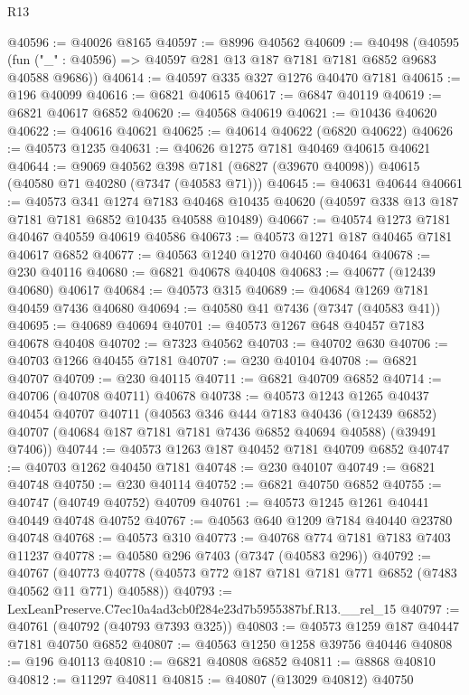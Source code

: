 \begin{lexlean}{R13}
\begin{coremodule}
@40596 := @40026 @8165
@40597 := @8996 @40562
@40609 := @40498
    (@40595 (fun ("_" : @40596) => @40597 @281 @13 @187 @7181 @7181 @6852 @9683 @40588 @9686))
@40614 := @40597 @335 @327 @1276 @40470 @7181
@40615 := @196 @40099
@40616 := @6821 @40615
@40617 := @6847 @40119
@40619 := @6821 @40617 @6852
@40620 := @40568 @40619
@40621 := @10436 @40620
@40622 := @40616 @40621
@40625 := @40614 @40622 (@6820 @40622)
@40626 := @40573 @1235
@40631 := @40626 @1275 @7181 @40469 @40615 @40621
@40644 := @9069
    @40562
    @398
    @7181
    (@6827 (@39670 @40098))
    @40615
    (@40580 @71 @40280 (@7347 (@40583 @71)))
@40645 := @40631 @40644
@40661 := @40573
    @341
    @1274
    @7183
    @40468
    @10435
    @40620
    (@40597 @338 @13 @187 @7181 @7181 @6852 @10435 @40588 @10489)
@40667 := @40574 @1273 @7181 @40467 @40559 @40619 @40586
@40673 := @40573 @1271 @187 @40465 @7181 @40617 @6852
@40677 := @40563 @1240 @1270 @40460 @40464
@40678 := @230 @40116
@40680 := @6821 @40678 @40408
@40683 := @40677 (@12439 @40680) @40617
@40684 := @40573 @315
@40689 := @40684 @1269 @7181 @40459 @7436 @40680
@40694 := @40580 @41 @7436 (@7347 (@40583 @41))
@40695 := @40689 @40694
@40701 := @40573 @1267 @648 @40457 @7183 @40678 @40408
@40702 := @7323 @40562
@40703 := @40702 @630
@40706 := @40703 @1266 @40455 @7181
@40707 := @230 @40104
@40708 := @6821 @40707
@40709 := @230 @40115
@40711 := @6821 @40709 @6852
@40714 := @40706 (@40708 @40711) @40678
@40738 := @40573
    @1243
    @1265
    @40437
    @40454
    @40707
    @40711
    (@40563
      @346
      @444
      @7183
      @40436
      (@12439 @6852)
      @40707
      (@40684 @187 @7181 @7181 @7436 @6852 @40694 @40588)
      (@39491 @7406))
@40744 := @40573 @1263 @187 @40452 @7181 @40709 @6852
@40747 := @40703 @1262 @40450 @7181
@40748 := @230 @40107
@40749 := @6821 @40748
@40750 := @230 @40114
@40752 := @6821 @40750 @6852
@40755 := @40747 (@40749 @40752) @40709
@40761 := @40573 @1245 @1261 @40441 @40449 @40748 @40752
@40767 := @40563 @640 @1209 @7184 @40440 @23780 @40748
@40768 := @40573 @310
@40773 := @40768 @774 @7181 @7183 @7403 @11237
@40778 := @40580 @296 @7403 (@7347 (@40583 @296))
@40792 := @40767
    (@40773 @40778 (@40573 @772 @187 @7181 @7181 @771 @6852 (@7483 @40562 @11 @771) @40588))
@40793 := LexLeanPreserve.C7ec10a4ad3cb0f284e23d7b5955387bf.R13.__rel_15
@40797 := @40761 (@40792 (@40793 @7393 @325))
@40803 := @40573 @1259 @187 @40447 @7181 @40750 @6852
@40807 := @40563 @1250 @1258 @39756 @40446
@40808 := @196 @40113
@40810 := @6821 @40808 @6852
@40811 := @8868 @40810
@40812 := @11297 @40811
@40815 := @40807 (@13029 @40812) @40750

\end{coremodule}
\end{lexlean}
